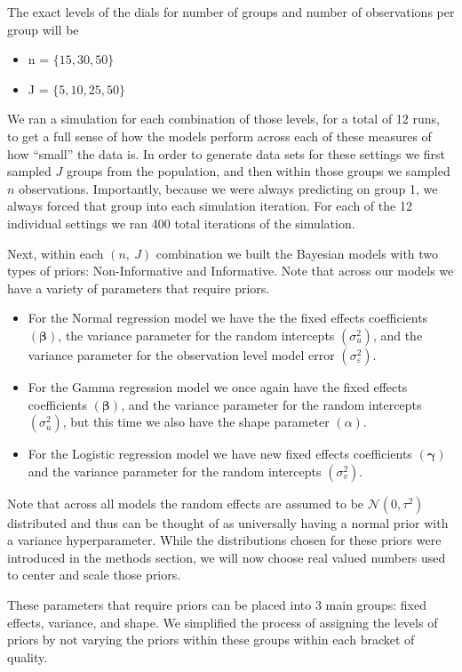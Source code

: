 \documentclass[12pt,twoside]{reedthesis}
\providecommand{\tightlist}{%
  \setlength{\itemsep}{0pt}\setlength{\parskip}{0pt}}
\begin{document}
The exact levels of the dials for number of groups and number of observations per group will be
\begin{itemize}
\tightlist
\item
  n = \(\{15, 30, 50\}\)
\item
  J = \(\{5, 10, 25, 50\}\)
\end{itemize}
We ran a simulation for each combination of those levels, for a total of 12 runs, to get a full sense of how the models perform across each of these measures of how ``small'' the data is. In order to generate data sets for these settings we first sampled \(J\) groups from the population, and then within those groups we sampled \(n\) observations. Importantly, because we were always predicting on group 1, we always forced that group into each simulation iteration. For each of the 12 individual settings we ran 400 total iterations of the simulation.

Next, within each \((n,\ J)\) combination we built the Bayesian models with two types of priors: Non-Informative and Informative. Note that across our models we have a variety of parameters that require priors.
\begin{itemize}
\item
  For the Normal regression model we have the the fixed effects coefficients \((\boldsymbol{\beta})\), the variance parameter for the random intercepts \((\sigma_u^2)\), and the variance parameter for the observation level model error \((\sigma_{\varepsilon}^2)\).
\item
  For the Gamma regression model we once again have the fixed effects coefficients \((\boldsymbol{\beta})\), and the variance parameter for the random intercepts \((\sigma_u^2)\), but this time we also have the shape parameter \((\alpha)\).
\item
  For the Logistic regression model we have new fixed effects coefficients \((\boldsymbol{\gamma})\) and the variance parameter for the random intercepts \((\sigma_v^2)\).
\end{itemize}
Note that across all models the random effects are assumed to be \(\mathcal{N}(0, \tau^2)\) distributed and thus can be thought of as universally having a normal prior with a variance hyperparameter. While the distributions chosen for these priors were introduced in the methods section, we will now choose real valued numbers used to center and scale those priors.

These parameters that require priors can be placed into 3 main groups: fixed effects, variance, and shape. We simplified the process of assigning the levels of priors by not varying the priors within these groups within each bracket of quality.
\end{document}
